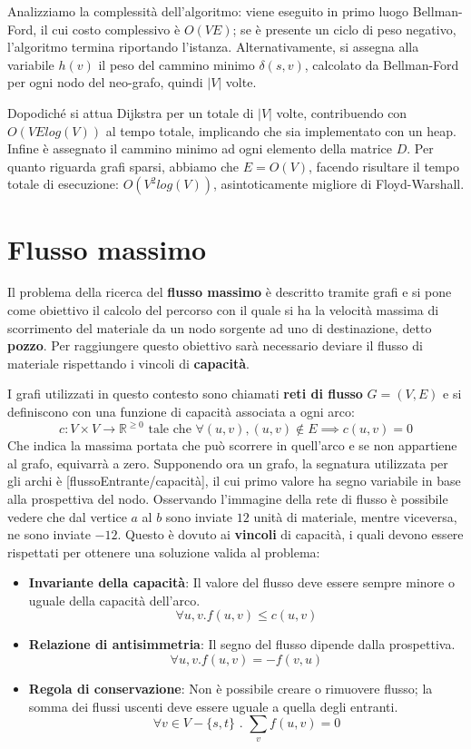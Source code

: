 \noindent Analizziamo la complessità dell'algoritmo: viene eseguito in primo luogo Bellman-Ford, il cui costo complessivo è $O(VE)$; se è presente un
ciclo di peso negativo, l'algoritmo termina riportando l'istanza. Alternativamente, si assegna alla variabile $h(v)$ il peso del cammino minimo
$\delta(s, v)$, calcolato da Bellman-Ford per ogni nodo del neo-grafo, quindi $|V|$ volte.\par
Dopodiché si attua Dijkstra per un totale di $|V|$ volte, contribuendo con $O(VElog(V))$ al tempo totale, implicando che sia implementato con un heap.
Infine è assegnato il cammino minimo ad ogni elemento della matrice $D$. Per quanto riguarda grafi sparsi, abbiamo che $E = O(V)$, facendo risultare il
tempo totale di esecuzione: $O(V^2log(V))$, asintoticamente migliore di Floyd-Warshall.

%

\section{Flusso massimo}
Il problema della ricerca del \textbf{flusso massimo} è descritto tramite grafi e si pone come obiettivo il calcolo del percorso con il quale si ha
la velocità massima di scorrimento del materiale da un nodo sorgente ad uno di destinazione, detto \textbf{pozzo}. Per raggiungere questo obiettivo
sarà necessario deviare il flusso di materiale rispettando i vincoli di \textbf{capacità}.\par
I grafi utilizzati in questo contesto sono chiamati \textbf{reti di flusso} $G = (V, E)$ e si definiscono con una funzione di capacità associata a ogni
arco: \[
	c:V\times V\to \mathbb{R}^{\geq 0} \text{ tale che } \forall (u,v), (u,v)\notin E \implies c(u,v) = 0
\]
\noindent Che indica la massima portata che può scorrere in quell'arco e se non appartiene al grafo, equivarrà a zero. Supponendo ora un grafo, la
segnatura utilizzata per gli archi è [flussoEntrante/capacità], il cui primo valore ha segno variabile in base alla prospettiva del nodo. Osservando
l'immagine della rete di flusso è possibile vedere che dal vertice $a$ al $b$ sono inviate $12$ unità di materiale, mentre viceversa, ne sono inviate
$-12$. Questo è dovuto ai \textbf{vincoli} di capacità, i quali devono essere rispettati per ottenere una soluzione valida al problema: \begin{itemize}
	\item \textbf{Invariante della capacità}: Il valore del flusso deve essere sempre minore o uguale della capacità dell'arco. \[
		\forall u,v . f(u,v) \leq c(u,v)
	\]
	\item \textbf{Relazione di antisimmetria}: Il segno del flusso dipende dalla prospettiva. \[
		\forall u,v . f(u,v) = -f(v,u)
	\]
	\item \textbf{Regola di conservazione}: Non è possibile creare o rimuovere flusso; la somma dei flussi uscenti deve essere uguale a quella degli
	entranti. \[
		\forall v\in V - \{s, t\} \text{ . } \sum_v f(u,v) = 0
	\]
\end{itemize}

